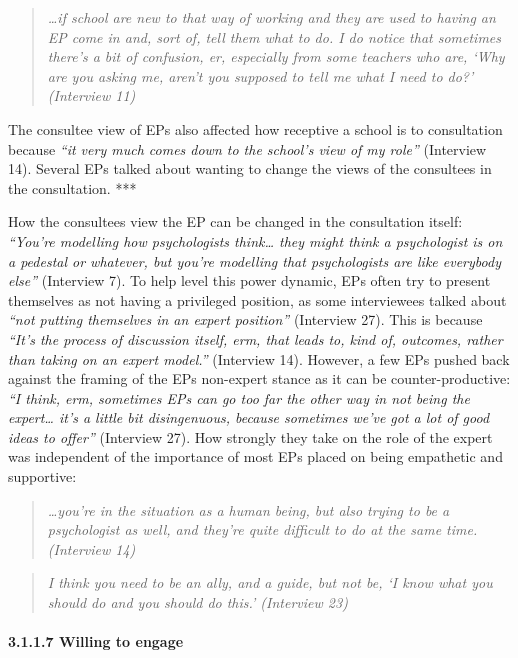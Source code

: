 \documentclass[
  english,
  man]{apa}
\let\oldparagraph\paragraph
\renewcommand{\paragraph}[1]{\oldparagraph{#1}\mbox{}}
\begin{document}
\begin{quote}
\emph{\ldots if school are new to that way of working and they are used to having
an EP come in and, sort of, tell them what to do. I do notice that
sometimes there's a bit of confusion, er, especially from some
teachers who are, `Why are you asking me, aren't you supposed to tell
me what I need to do?' (Interview 11)}
\end{quote}

The consultee view of EPs also affected how receptive a school is to consultation because \emph{``it very much comes down to the school's view of my role''} (Interview 14). Several EPs talked about wanting to change the views of the consultees in the consultation. ***

How the consultees view the EP can be changed in the consultation itself: \emph{``You're modelling how psychologists think\ldots{} they might think a psychologist is on a pedestal or whatever, but you're modelling that psychologists are like everybody else''} (Interview 7). To help level this power dynamic, EPs often try to present themselves as not having a privileged position, as some interviewees talked about \emph{``not putting themselves in an expert position''} (Interview 27). This is because \emph{``It's the process of discussion itself, erm, that leads to, kind of, outcomes, rather than taking on an expert model.''} (Interview 14). However, a few EPs pushed back against the framing of the EPs non-expert stance as it can be counter-productive: \emph{``I think, erm, sometimes EPs can go too far the other way in not being the expert\ldots{} it's a little bit disingenuous, because sometimes we've got a lot of good ideas to offer''} (Interview 27). How strongly they take on the role of the expert was independent of the importance of most EPs placed on being empathetic and supportive:

\begin{quote}
\emph{\ldots you're in the situation as a human being, but also trying to be a
psychologist as well, and they're quite difficult to do at the same
time. (Interview 14)}
\end{quote}

\begin{quote}
\emph{I think you need to be an ally, and a guide, but not be, `I know what
you should do and you should do this.' (Interview 23)}
\end{quote}

\hypertarget{willing-to-engage}{%
\paragraph{3.1.1.7 Willing to engage}\label{willing-to-engage}}
\end{document}
